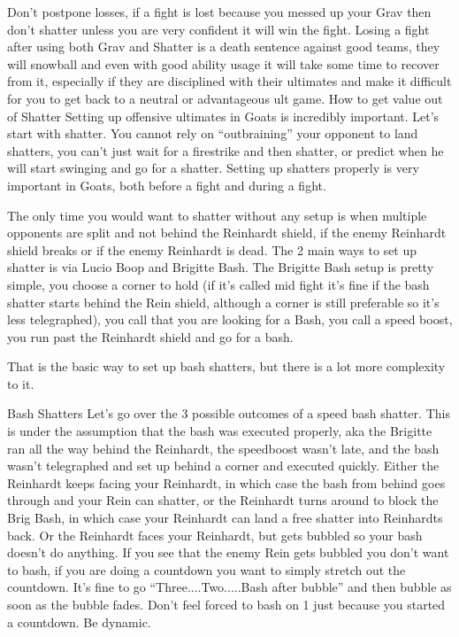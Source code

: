 Don’t postpone losses, if a fight is lost because you messed up your Grav then don’t shatter unless you are very confident it will win the fight. Losing a fight after using both Grav and Shatter is a death sentence against good teams, they will snowball and even with good ability usage it will take some time to recover from it, especially if they are disciplined with their ultimates and make it difficult for you to get back to a neutral or advantageous ult game.
How to get value out of Shatter
Setting up offensive ultimates in Goats is incredibly important. Let’s start with shatter. You cannot rely on “outbraining” your opponent to land shatters, you can’t just wait for a firestrike and then shatter, or predict when he will start swinging and go for a shatter. Setting up shatters properly is very important in Goats, both before a fight and during a fight.

The only time you would want to shatter without any setup is when multiple opponents are split and not behind the Reinhardt shield, if the enemy Reinhardt shield breaks or if the enemy Reinhardt is dead. The 2 main ways to set up shatter is via Lucio Boop and Brigitte Bash. The Brigitte Bash setup is pretty simple, you choose a corner to hold (if it’s called mid fight it’s fine if the bash shatter starts behind the Rein shield, although a corner is still preferable so it’s less telegraphed), you call that you are looking for a Bash, you call a speed boost, you run past the Reinhardt shield and go for a bash.

That is the basic way to set up bash shatters, but there is a lot more complexity to it. 



Bash Shatters
Let’s go over the 3 possible outcomes of a speed bash shatter. This is under the assumption that the bash was executed properly, aka the Brigitte ran all the way behind the Reinhardt, the speedboost wasn’t late, and the bash wasn’t telegraphed and set up behind a corner and executed quickly. Either the Reinhardt keeps facing your Reinhardt, in which case the bash from behind goes through and your Rein can shatter, or the Reinhardt turns around to block the Brig Bash, in which case your Reinhardt can land a free shatter into Reinhardts back. Or the Reinhardt faces your Reinhardt, but gets bubbled so your bash doesn’t do anything.
If you see that the enemy Rein gets bubbled you don’t want to bash, if you are doing a countdown you want to simply stretch out the countdown. It’s fine to go “Three....Two.....Bash after bubble” and then bubble as soon as the bubble fades. Don’t feel forced to bash on 1 just because you started a countdown. Be dynamic. 

